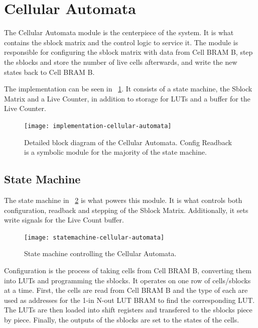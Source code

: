 
\section{Cellular Automata}

The Cellular Automata module is the centerpiece of the system.
It is what contains the sblock matrix and the control logic to service it.
The module is responsible for configuring the sblock matrix with data from Cell BRAM B, step the sblocks and store the number of live cells afterwards, and write the new states back to Cell BRAM B.

The implementation can be seen in \figurename~\ref{fig:implementation-cellular-automata}.
It consists of a state machine, the Sblock Matrix and a Live Counter, in addition to storage for LUTs and a buffer for the Live Counter.

\begin{figure}[!ht]
    \centering
    \texttt{[image: implementation-cellular-automata]}
    \caption[Cellular Automata]{
        Detailed block diagram of the Cellular Automata.
        Config Readback is a symbolic module for the majority of the state machine.
    }
    \label{fig:implementation-cellular-automata}
\end{figure}

\subsection{State Machine}

The state machine in \figurename~\ref{fig:statemachine-cellular-automata} is what powers this module.
It is what controls both configuration, readback and stepping of the Sblock Matrix.
Additionally, it sets write signals for the Live Count buffer.

\begin{figure}[!ht]
    \centering
    \texttt{[image: statemachine-cellular-automata]}
    \caption[Cellular Automata state machine]{
        State machine controlling the Cellular Automata.
    }
    \label{fig:statemachine-cellular-automata}
\end{figure}

Configuration is the process of taking cells from Cell BRAM B, converting them into LUTs and programming the sblocks.
It operates on one row of cells/sblocks at a time.
First, the cells are read from Cell BRAM B and the type of each are used as addresses for the 1-in N-out LUT BRAM to find the corresponding LUT.
The LUTs are then loaded into shift registers and transfered to the sblocks piece by piece.
Finally, the outputs of the sblocks are set to the states of the cells.


